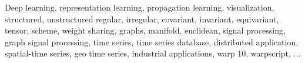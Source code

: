 \begin{keywords}
Deep learning,
representation learning,
propagation learning,
visualization,
structured,
unstructured regular,
irregular,
covariant,
invariant,
equivariant,
tensor,
scheme,
weight sharing,
graphs,
manifold,
euclidean,
signal processing,
graph signal processing,
time series,
time series database,
distributed application,
spatial-time series,
geo time series,
industrial applications,
warp 10,
warpscript,
...
\end{keywords}